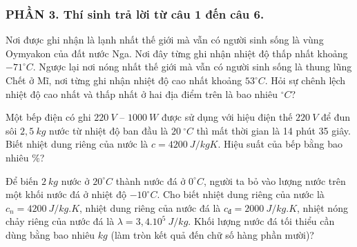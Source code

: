 \subsubsection*{PHẦN 3. Thí sinh trả lời từ câu 1 đến câu 6.}
\setcounter{ex}{0}
\begin{ex}%
	Nơi được ghi nhận là lạnh nhất thế giới mà vẫn có người sinh sống là vùng Oymyakon của đất nước Nga. Nơi đây từng ghi nhận nhiệt độ thấp nhất khoảng $-71^\circ C$. Ngược lại nơi nóng nhất thế giới mà vẫn có người sinh sống là thung lũng Chết ở Mĩ, nơi từng ghi nhận nhiệt độ cao nhất khoảng $53^\circ C$. Hỏi sự chênh lệch nhiệt độ cao nhất và thấp nhất ở hai địa điểm trên là bao nhiêu $^\circ C$?
\end{ex}

\begin{ex}%
	Một bếp điện có ghi $220\ V$ – $1000\ W$ được sử dụng với hiệu điện thế $220\ V$ để đun sôi $2,5\ kg$ nước từ nhiệt độ ban đầu là $20\ ^\circ C$ thì mất thời gian là 14 phút 35 giây. Biết nhiệt dung riêng của nước là $c = 4200\ J/kgK$. Hiệu suất của bếp bằng bao nhiêu $\%$?
\end{ex}

\begin{ex}%
	Để biến $2\ kg$ nước ở $20^\circ C$ thành nước đá ở $0^\circ C$, người ta bỏ vào lượng nước trên một khối nước đá ở nhiệt độ $-10^\circ C$. Cho biết nhiệt dung riêng của nước là $c_{n} = 4200\ J/kg.K$, nhiệt dung riêng của nước đá là $c_{\text{đ}} = 2000\ J/kg.K$, nhiệt nóng chảy riêng của nước đá là $\lambda = 3,4.10^5\ J/kg$. Khối lượng nước đá tối thiểu cần dùng bằng bao nhiêu $kg$ (làm tròn kết quả đến chữ số hàng phần mười)?
\end{ex}

